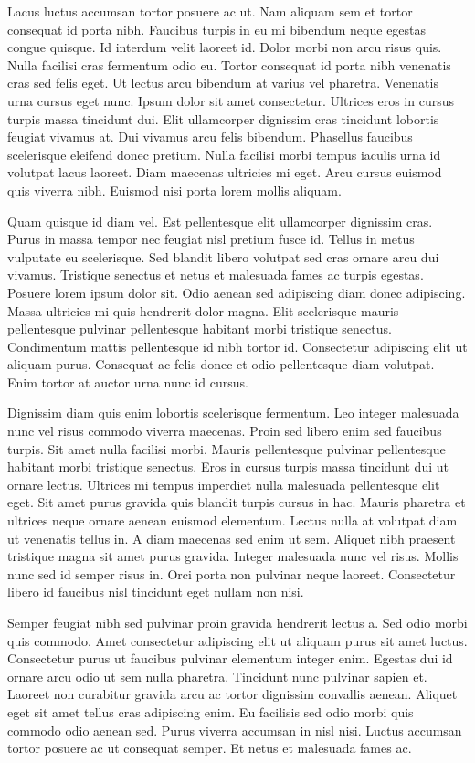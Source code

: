 \documentclass[11pt,a4paper]{article}
\begin{document}
Lacus luctus accumsan tortor posuere ac ut. Nam aliquam sem et tortor consequat id porta nibh. Faucibus turpis in eu mi bibendum neque egestas congue quisque. Id interdum velit laoreet id. Dolor morbi non arcu risus quis. Nulla facilisi cras fermentum odio eu. Tortor consequat id porta nibh venenatis cras sed felis eget. Ut lectus arcu bibendum at varius vel pharetra. Venenatis urna cursus eget nunc. Ipsum dolor sit amet consectetur. Ultrices eros in cursus turpis massa tincidunt dui. Elit ullamcorper dignissim cras tincidunt lobortis feugiat vivamus at. Dui vivamus arcu felis bibendum. Phasellus faucibus scelerisque eleifend donec pretium. Nulla facilisi morbi tempus iaculis urna id volutpat lacus laoreet. Diam maecenas ultricies mi eget. Arcu cursus euismod quis viverra nibh. Euismod nisi porta lorem mollis aliquam.

Quam quisque id diam vel. Est pellentesque elit ullamcorper dignissim cras. Purus in massa tempor nec feugiat nisl pretium fusce id. Tellus in metus vulputate eu scelerisque. Sed blandit libero volutpat sed cras ornare arcu dui vivamus. Tristique senectus et netus et malesuada fames ac turpis egestas. Posuere lorem ipsum dolor sit. Odio aenean sed adipiscing diam donec adipiscing. Massa ultricies mi quis hendrerit dolor magna. Elit scelerisque mauris pellentesque pulvinar pellentesque habitant morbi tristique senectus. Condimentum mattis pellentesque id nibh tortor id. Consectetur adipiscing elit ut aliquam purus. Consequat ac felis donec et odio pellentesque diam volutpat. Enim tortor at auctor urna nunc id cursus.

Dignissim diam quis enim lobortis scelerisque fermentum. Leo integer malesuada nunc vel risus commodo viverra maecenas. Proin sed libero enim sed faucibus turpis. Sit amet nulla facilisi morbi. Mauris pellentesque pulvinar pellentesque habitant morbi tristique senectus. Eros in cursus turpis massa tincidunt dui ut ornare lectus. Ultrices mi tempus imperdiet nulla malesuada pellentesque elit eget. Sit amet purus gravida quis blandit turpis cursus in hac. Mauris pharetra et ultrices neque ornare aenean euismod elementum. Lectus nulla at volutpat diam ut venenatis tellus in. A diam maecenas sed enim ut sem. Aliquet nibh praesent tristique magna sit amet purus gravida. Integer malesuada nunc vel risus. Mollis nunc sed id semper risus in. Orci porta non pulvinar neque laoreet. Consectetur libero id faucibus nisl tincidunt eget nullam non nisi.

Semper feugiat nibh sed pulvinar proin gravida hendrerit lectus a. Sed odio morbi quis commodo. Amet consectetur adipiscing elit ut aliquam purus sit amet luctus. Consectetur purus ut faucibus pulvinar elementum integer enim. Egestas dui id ornare arcu odio ut sem nulla pharetra. Tincidunt nunc pulvinar sapien et. Laoreet non curabitur gravida arcu ac tortor dignissim convallis aenean. Aliquet eget sit amet tellus cras adipiscing enim. Eu facilisis sed odio morbi quis commodo odio aenean sed. Purus viverra accumsan in nisl nisi. Luctus accumsan tortor posuere ac ut consequat semper. Et netus et malesuada fames ac.
\end{document}
